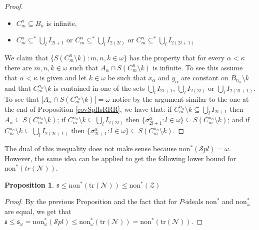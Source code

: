\documentclass[a4paper]{amsart}
\newtheorem{proposition}[theorem]{Proposition}
\newcommand{\sss}{\mathfrak{s}}
\newcommand{\Null}{\mathcal{N}}
\newcommand{\non}{\mathrm{non}}
\newcommand{\Z}{\mathcal{Z}}
\newcommand{\SPL}{\mathcal{S}pl}
\newcommand{\trN}{\mathrm{tr}(\Null)}
\begin{document}
\begin{proof}
        \begin{itemize}
            \item[--] $C^{n}_{m}\subseteq B_{n}$ is infinite,
            \item[--] $C^{n}_{m}\subseteq^{*}\bigcup_{l}I_{2l+1}$ or $C^{n}_{m}\subseteq^{*}\bigcup_{l}I_{2(2l)}$ or $C^{n}_{m}\subseteq^{*}\bigcup_{l}I_{2(2l+1)}$
        \end{itemize}
        We claim that $\{S(C^{n}_{m}\setminus k):m,n,k\in\omega\}$ has the property that for every $\alpha<\kappa$ there are $m,n,k\in\omega$ such that $A_{\alpha}\cap S(C^{n}_{m}\setminus k)$ is infinite. To see this assume that $\alpha<\kappa$ is given and let $k\in\omega$ be such that $x_{\alpha}$ and $y_{\alpha}$ are constant on $B_{n_{\alpha}}\setminus k$ and that $C^{n_{\alpha}}_{m}\setminus k$ is contained in one of the sets $\bigcup_{l}I_{2l+1}$, $\bigcup_{l}I_{2(2l)}$ or $\bigcup_{l}I_{2(2l+1)}$. To see that $|A_{\alpha}\cap S(C^{n_{\alpha}}_{m}\setminus k)|=\omega$ notice by the argument similar to the one at the end of Proposition \ref{covSplIsRRR}, we have that: if $C^{n_{\alpha}}_{m}\setminus k\subseteq \bigcup_{l}I_{2l+1}$ then $A_{\alpha}\subseteq S(C^{n_{\alpha}}_{m}\setminus k)$; if $C^{n_{\alpha}}_{m}\setminus k\subseteq \bigcup_{l}I_{2(2l)}$ then $\{\sigma^{\alpha}_{2l+1}:l\in\omega\}\subseteq S(C^{n_{\alpha}}_{m}\setminus k)$; and if $C^{n_{\alpha}}_{m}\setminus k\subseteq \bigcup_{l}I_{2(2l+1)}$ then $\{\sigma^{\alpha}_{2l+1}:l\in\omega\}\subseteq S(C^{n_{\alpha}}_{m}\setminus k)$.
    \end{proof}
    The dual of this inequality does not make sense because $\non^{*}(\SPL)=\omega$. However, the same idea can be applied to get the following lower bound for $\non^{*}(tr(\Null))$.
\begin{proposition}
    $\sss\leq \non^{*}(\trN)\leq\non^{*}(\Z)$
\end{proposition}
\begin{proof}
    By the previous Proposition and the fact that for $P$-ideals $\non^{*}$ and $\non^{*}_{\omega}$ are equal, we get that $\sss\leq\sss_{\omega}=\non^{*}_{\omega}(\SPL)\leq\non^{*}_{\omega}(\trN)=\non^{*}(\trN)$.
\end{proof}
\end{document}

